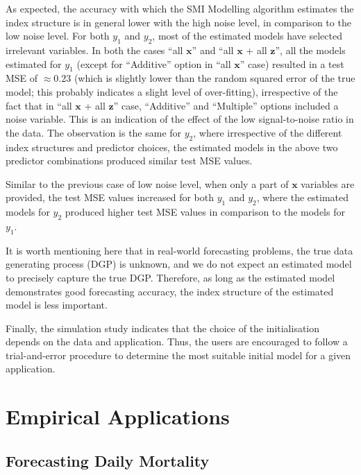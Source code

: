 \documentclass[11pt,a4paper,]{article}
\begin{document}
As expected, the accuracy with which the SMI Modelling algorithm
estimates the index structure is in general lower with the high noise
level, in comparison to the low noise level. For both \(y_{1}\) and
\(y_{2}\), most of the estimated models have selected irrelevant
variables. In both the cases ``all \(\bm{x}\)'' and ``all \(\bm{x}\) +
all \(\bm{z}\)'', all the models estimated for \(y_{1}\) (except for
``Additive'' option in ``all \(\bm{x}\)'' case) resulted in a test MSE
of \(\approx 0.23\) (which is slightly lower than the random squared
error of the true model; this probably indicates a slight level of
over-fitting), irrespective of the fact that in ``all \(\bm{x}\) + all
\(\bm{z}\)'' case, ``Additive'' and ``Multiple'' options included a
noise variable. This is an indication of the effect of the low
signal-to-noise ratio in the data. The observation is the same for
\(y_{2}\), where irrespective of the different index structures and
predictor choices, the estimated models in the above two predictor
combinations produced similar test MSE values.

Similar to the previous case of low noise level, when only a part of
\(\bm{x}\) variables are provided, the test MSE values increased for
both \(y_{1}\) and \(y_{2}\), where the estimated models for \(y_{2}\)
produced higher test MSE values in comparison to the models for
\(y_{1}\).

It is worth mentioning here that in real-world forecasting problems, the
true data generating process (DGP) is unknown, and we do not expect an
estimated model to precisely capture the true DGP. Therefore, as long as
the estimated model demonstrates good forecasting accuracy, the index
structure of the estimated model is less important.

Finally, the simulation study indicates that the choice of the
initialisation depends on the data and application. Thus, the users are
encouraged to follow a trial-and-error procedure to determine the most
suitable initial model for a given application.

\hypertarget{sec-application}{%
\section{Empirical Applications}\label{sec-application}}

\hypertarget{sec-mortality}{%
\subsection{Forecasting Daily Mortality}\label{sec-mortality}}
\end{document}
